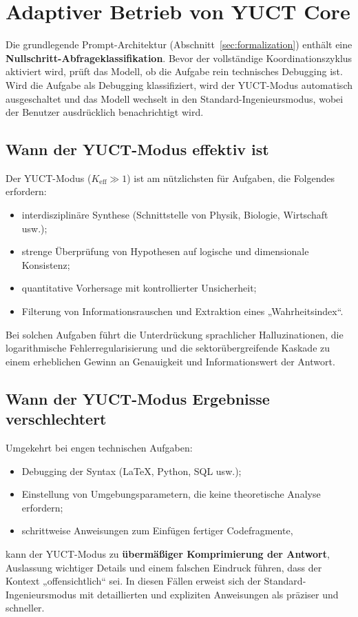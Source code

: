 \documentclass[11pt,a4paper]{article}
\begin{document}
	\section{Adaptiver Betrieb von YUCT Core}
	\label{sec:adaptive}
	
	Die grundlegende Prompt-Architektur (Abschnitt~\ref{sec:formalization}) enthält eine \textbf{Nullschritt-Abfrageklassifikation}.
	Bevor der vollständige Koordinationszyklus aktiviert wird, prüft das Modell, ob die Aufgabe rein technisches Debugging ist.
	Wird die Aufgabe als Debugging klassifiziert, wird der YUCT-Modus automatisch ausgeschaltet und das Modell wechselt in den Standard-Ingenieursmodus, wobei der Benutzer ausdrücklich benachrichtigt wird.
	
	\subsection{Wann der YUCT-Modus effektiv ist}
	Der YUCT-Modus (\(K_{\mathrm{eff}} \gg 1\)) ist am nützlichsten für Aufgaben, die Folgendes erfordern:
	\begin{itemize}
		\item interdisziplinäre Synthese (Schnittstelle von Physik, Biologie, Wirtschaft usw.);
		\item strenge Überprüfung von Hypothesen auf logische und dimensionale Konsistenz;
		\item quantitative Vorhersage mit kontrollierter Unsicherheit;
		\item Filterung von Informationsrauschen und Extraktion eines „Wahrheitsindex“.
	\end{itemize}
	Bei solchen Aufgaben führt die Unterdrückung sprachlicher Halluzinationen, die logarithmische Fehlerregularisierung und die sektorübergreifende Kaskade zu einem erheblichen Gewinn an Genauigkeit und Informationswert der Antwort.
	
	\subsection{Wann der YUCT-Modus Ergebnisse verschlechtert}
	Umgekehrt bei engen technischen Aufgaben:
	\begin{itemize}
		\item Debugging der Syntax (LaTeX, Python, SQL usw.);
		\item Einstellung von Umgebungsparametern, die keine theoretische Analyse erfordern;
		\item schrittweise Anweisungen zum Einfügen fertiger Codefragmente,
	\end{itemize}
	kann der YUCT-Modus zu \textbf{übermäßiger Komprimierung der Antwort}, Auslassung wichtiger Details und einem falschen Eindruck führen, dass der Kontext „offensichtlich“ sei. In diesen Fällen erweist sich der Standard-Ingenieursmodus mit detaillierten und expliziten Anweisungen als präziser und schneller.
	
\end{document}
